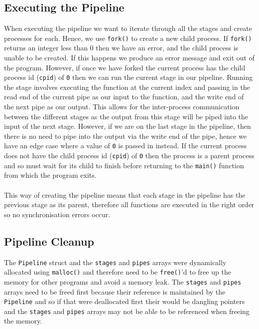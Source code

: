 \documentclass{article}
\begin{document}
    \subsection{Executing the Pipeline}
    When executing the pipeline we want to iterate through all the stages and create processes for each.
    Hence, we use \verb+fork()+ to create a new child process.
    If \verb+fork()+ returns an integer less than 0 then we have an error, and the child process is unable to be created.
    If this happens we produce an error message and exit out of the program.
    However, if once we have forked the current process has the child process id (\verb+cpid+) of \verb+0+ then we can run the current stage in our pipeline.
    Running the stage involves executing the function at the current index and passing in the read end of the current pipe as our input to the function, and the write end of the next pipe as our output.
    This allows for the inter-process communication between the different stages as the output from this stage will be piped into the input of the next stage.
    However, if we are on the last stage in the pipeline, then there is no need to pipe into the output via the write end of the pipe, hence we have an edge case where a value of \verb+0+ is passed in instead.
    If the current process does not have the child process id (\verb+cpid+) of \verb+0+ then the process is a parent process and so must wait for its child to finish before returning to the \verb+main()+ function from which the program exits.
    \\ \\ This way of creating the pipeline means that each stage in the pipeline has the previous stage as its parent, therefore all functions are executed in the right order so no synchronisation errors occur.

    \subsection{Pipeline Cleanup}
    The \verb+Pipeline+ struct and the \verb+stages+ and \verb+pipes+ arrays were dynamically allocated using \verb+malloc()+ and therefore need to be \verb+free()+'d to free up the memory for other programs and avoid a memory leak.
    The \verb+stages+ and \verb+pipes+ arrays need to be freed first because their reference is maintained by the \verb+Pipeline+ and so if that were deallocated first their would be dangling pointers and the \verb+stages+ and \verb+pipes+ arrays may not be able to be referenced when freeing the memory.
\end{document}

